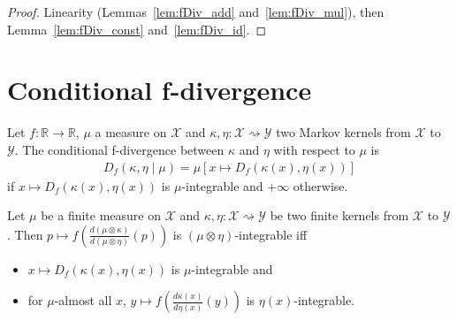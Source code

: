 \begin{proof}
Linearity (Lemmas~\ref{lem:fDiv_add} and~\ref{lem:fDiv_mul}), then Lemma~\ref{lem:fDiv_const} and~\ref{lem:fDiv_id}.
\end{proof}

\section{Conditional f-divergence}

\begin{definition}
  \label{def:condFDiv}
  \leanok
  Let $f : \mathbb{R} \to \mathbb{R}$, $\mu$ a measure on $\mathcal X$ and $\kappa, \eta : \mathcal X \rightsquigarrow \mathcal Y$ two Markov kernels from $\mathcal X$ to $\mathcal Y$. The conditional f-divergence between $\kappa$ and $\eta$ with respect to $\mu$ is
  \begin{align*}
  D_f(\kappa, \eta \mid \mu) = \mu\left[x \mapsto D_f(\kappa(x), \eta(x))\right]
  \end{align*}
  if $x \mapsto D_f(\kappa(x), \eta(x))$ is $\mu$-integrable and $+\infty$ otherwise.
\end{definition}

\begin{lemma}
  \label{lem:integrable_fDiv_compProd_iff}
  \leanok
  Let $\mu$ be a finite measure on $\mathcal X$ and $\kappa, \eta : \mathcal X \rightsquigarrow \mathcal Y$ be two finite kernels from $\mathcal X$ to $\mathcal Y$.
  Then $p \mapsto f \left(\frac{d(\mu \otimes \kappa)}{d(\mu \otimes \eta)}(p)\right)$ is $(\mu \otimes \eta)$-integrable iff
  \begin{itemize}
    \item $x \mapsto D_f(\kappa(x), \eta(x))$ is $\mu$-integrable and
    \item for $\mu$-almost all $x$, $y \mapsto f \left( \frac{d\kappa(x)}{d\eta(x)}(y) \right)$ is $\eta(x)$-integrable. 
  \end{itemize}
\end{lemma}

